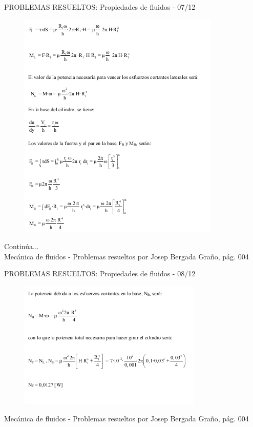 \begin{frame}{PROBLEMAS RESUELTOS: Propiedades de fluidos - 07/12}
\justifying
\begin{figure}[H]
\centering
\includegraphics[scale=0.4]{Section_Files/S2-imagenes-Jhon/Book-ProbResuelts/P02-E03.png}
\end{figure}
Continúa...\\
{\tiny Mecánica de fluidos - Problemas resueltos por Josep Bergada Graño, pág. 004}
\end{frame}

\begin{frame}{PROBLEMAS RESUELTOS: Propiedades de fluidos - 08/12}
\justifying
\begin{figure}[H]
\centering
\includegraphics[scale=0.4]{Section_Files/S2-imagenes-Jhon/Book-ProbResuelts/P02-E04.png}
\end{figure}
{\tiny Mecánica de fluidos - Problemas resueltos por Josep Bergada Graño, pág. 004}
\end{frame}

